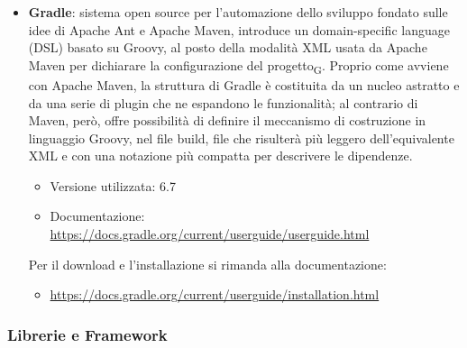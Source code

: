 \begin{itemize}
	\item \textbf{Gradle}: sistema open source per l'automazione dello sviluppo fondato sulle idee di Apache Ant e Apache Maven, introduce un domain-specific language (DSL) basato su Groovy, al posto della modalità XML usata da Apache Maven per dichiarare la configurazione del progetto\textsubscript{G}. Proprio come avviene con Apache Maven, la struttura di Gradle è costituita da un nucleo astratto e da una serie di plugin che ne espandono le funzionalità; al contrario di Maven, però, offre possibilità di definire il meccanismo di costruzione in linguaggio Groovy, nel file build, file che risulterà più leggero dell'equivalente XML e con una notazione più compatta per descrivere le dipendenze.
	\begin{itemize}
		\item Versione utilizzata: 6.7
		\item Documentazione: \url{https://docs.gradle.org/current/userguide/userguide.html}
	\end{itemize}
	Per il download e l'installazione si rimanda alla documentazione:
	\begin{itemize}
		\item \url{https://docs.gradle.org/current/userguide/installation.html}
	\end{itemize}

\end{itemize}

\subsubsection{Librerie e Framework}

